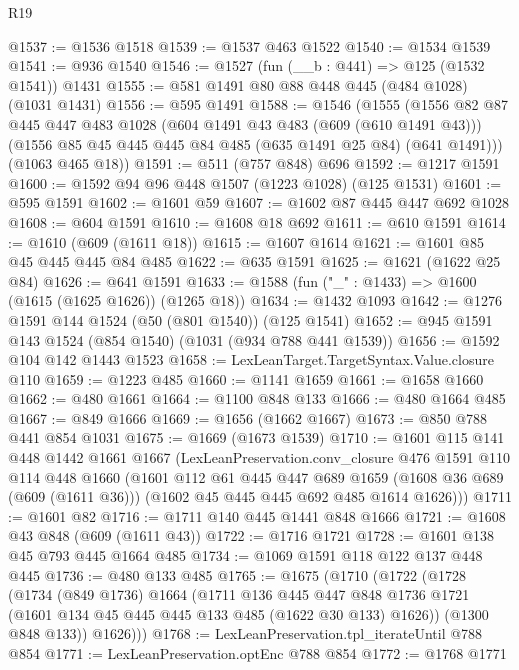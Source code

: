 \begin{lexlean}{R19}
\begin{coremodule}
@1537 := @1536 @1518
@1539 := @1537 @463 @1522
@1540 := @1534 @1539
@1541 := @936 @1540
@1546 := @1527 (fun (__b : @441) => @125 (@1532 @1541)) @1431
@1555 := @581 @1491 @80 @88 @448 @445 (@484 @1028) (@1031 @1431)
@1556 := @595 @1491
@1588 := @1546
    (@1555
      (@1556
        @82
        @87
        @445
        @447
        @483
        @1028
        (@604 @1491 @43 @483 (@609 (@610 @1491 @43)))
        (@1556 @85 @45 @445 @445 @84 @485 (@635 @1491 @25 @84) (@641 @1491)))
      (@1063 @465 @18))
@1591 := @511 (@757 @848) @696
@1592 := @1217 @1591
@1600 := @1592 @94 @96 @448 @1507 (@1223 @1028) (@125 @1531)
@1601 := @595 @1591
@1602 := @1601 @59
@1607 := @1602 @87 @445 @447 @692 @1028
@1608 := @604 @1591
@1610 := @1608 @18 @692
@1611 := @610 @1591
@1614 := @1610 (@609 (@1611 @18))
@1615 := @1607 @1614
@1621 := @1601 @85 @45 @445 @445 @84 @485
@1622 := @635 @1591
@1625 := @1621 (@1622 @25 @84)
@1626 := @641 @1591
@1633 := @1588 (fun ("_" : @1433) => @1600 (@1615 (@1625 @1626)) (@1265 @18))
@1634 := @1432 @1093
@1642 := @1276 @1591 @144 @1524 (@50 (@801 @1540)) (@125 @1541)
@1652 := @945 @1591 @143 @1524 (@854 @1540) (@1031 (@934 @788 @441 @1539))
@1656 := @1592 @104 @142 @1443 @1523
@1658 := LexLeanTarget.TargetSyntax.Value.closure @110
@1659 := @1223 @485
@1660 := @1141 @1659
@1661 := @1658 @1660
@1662 := @480 @1661
@1664 := @1100 @848 @133
@1666 := @480 @1664 @485
@1667 := @849 @1666
@1669 := @1656 (@1662 @1667)
@1673 := @850 @788 @441 @854 @1031
@1675 := @1669 (@1673 @1539)
@1710 := @1601
    @115
    @141
    @448
    @1442
    @1661
    @1667
    (LexLeanPreservation.conv_closure
      @476
      @1591
      @110
      @114
      @448
      @1660
      (@1601
        @112
        @61
        @445
        @447
        @689
        @1659
        (@1608 @36 @689 (@609 (@1611 @36)))
        (@1602 @45 @445 @445 @692 @485 @1614 @1626)))
@1711 := @1601 @82
@1716 := @1711 @140 @445 @1441 @848 @1666
@1721 := @1608 @43 @848 (@609 (@1611 @43))
@1722 := @1716 @1721
@1728 := @1601 @138 @45 @793 @445 @1664 @485
@1734 := @1069 @1591 @118 @122 @137 @448 @445
@1736 := @480 @133 @485
@1765 := @1675
    (@1710
      (@1722
        (@1728
          (@1734
            (@849 @1736)
            @1664
            (@1711
              @136
              @445
              @447
              @848
              @1736
              @1721
              (@1601 @134 @45 @445 @445 @133 @485 (@1622 @30 @133) @1626))
            (@1300 @848 @133))
          @1626)))
@1768 := LexLeanPreservation.tpl_iterateUntil @788 @854
@1771 := LexLeanPreservation.optEnc @788 @854
@1772 := @1768 @1771

\end{coremodule}
\end{lexlean}
